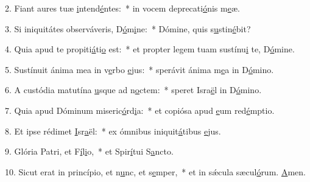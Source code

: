 2. Fiant aures tuæ \uline{i}ntend\uline{é}ntes:~* in vocem deprecati\uline{ó}nis m\uline{e}æ.\par 
3. Si iniquitátes observáveris, D\uline{ó}m\uline{i}ne:~* Dómine, quis s\uline{u}stin\uline{é}bit?\par 
4. Quia apud te propiti\uline{á}ti\uline{o} est:~* et propter legem tuam sustínu\uline{i} te, D\uline{ó}mine.\par 
5. Sustínuit ánima mea in v\uline{e}rbo \uline{e}jus:~* sperávit ánima m\uline{e}a in D\uline{ó}mino.\par 
6. A custódia matutína \uline{u}sque ad n\uline{o}ctem:~* speret Isra\uline{ë}l in D\uline{ó}mino.\par 
7. Quia apud Dóminum miseric\uline{ó}rd\uline{i}a:~* et copiósa apud \uline{e}um red\uline{é}mptio.\par 
8. Et ipse rédimet \uline{I}sr\uline{a}ël:~* ex ómnibus iniquit\uline{á}tibus \uline{e}jus.\par 
9. Glória Patri, et F\uline{í}l\uline{i}o,~* et Spir\uline{í}tui S\uline{a}ncto.\par 
10. Sicut erat in princípio, et n\uline{u}nc, et s\uline{e}mper,~* et in sǽcula sæcul\uline{ó}rum. \uline{A}men.\par 
